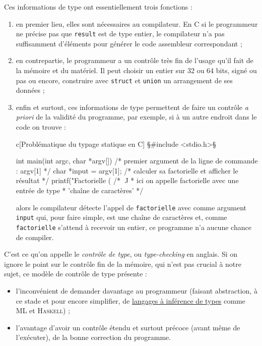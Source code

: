 Ces informations de type ont essentiellement trois fonctions :
\begin{enumerate}
	\item en premier lieu, elles sont nécessaires au compilateur. En C si le programmeur ne précise pas que \texttt{result} est de type entier, le compilateur n'a pas suffisamment d'éléments pour générer le code assembleur correspondant ;
	\item en contrepartie, le programmeur a un contrôle très fin de l'usage qu'il fait de la mémoire et du matériel. Il peut choisir un entier sur 32 ou 64 bits, signé ou pas ou encore, construire avec \texttt{struct} et \texttt{union} un arrangement de ses données ;
	\item enfin et surtout, ces informations de type permettent de faire un contrôle \textit{a priori} de la validité du programme, par exemple, si à un autre endroit dans le code on trouve :
	
\begin{code*}[before skip=6pt]{c}[Problématique du typage statique en C]
§\#{}include <stdio.h>§

int main(int argc, char *argv[]) {
	/* premier argument de la ligne de commande : argv[1] */
	char *input = argv[1];
	/* calculer sa factorielle et afficher le résultat */
	printf("Factorielle (%
	/*                                               ^^^^^
	* ici on appelle factorielle avec une entrée de type 
	* 'chaîne de caractères' */
}
\end{code*}

\noindent alors le compilateur détecte l'appel de \texttt{factorielle} avec comme argument \texttt{input} qui, pour faire simple, est une chaîne de caractères et, comme \texttt{factorielle} s'attend à recevoir un entier, ce programme n'a aucune chance de compiler.
\end{enumerate}

C'est ce qu'on appelle le \emph{contrôle de type}, ou \textit{type-checking} en anglais. Si on ignore le point sur le contrôle fin de la mémoire, qui n'est pas crucial à notre sujet, ce modèle de contrôle de type présente :
\begin{itemize}
	\item l'inconvénient de demander davantage au programmeur (faisant abstraction, à ce stade et pour encore simplifier, de \href{https://en.wikipedia.org/wiki/Type\_inference}{langages à inférence de types} comme \textsc{ML} et \textsc{Haskell}) ;
	\item l'avantage d'avoir un contrôle étendu et surtout précoce (avant même de l'exécuter), de la bonne correction du programme.
\end{itemize}


